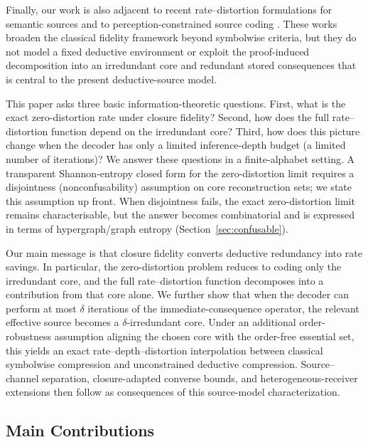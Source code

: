 \documentclass[journal,onecolumn]{IEEEtran}
\numberwithin{equation}{section}
\begin{document}
Finally, our work is also adjacent to recent rate--distortion
formulations for semantic sources and to perception-constrained source
coding
\cite{liu2022indirect,zhao2025semantic,han2025extended,
salehkalaiabar2024rate}. These works broaden the classical fidelity
framework beyond symbolwise criteria, but they do not model a fixed
deductive environment or exploit the proof-induced decomposition into
an irredundant core and redundant stored consequences that is central
to the present deductive-source model.

This paper asks three basic information-theoretic questions. First, what is the exact zero-distortion rate under closure fidelity? Second, how does the full rate--distortion function depend on the irredundant core? Third, how does this picture change when the decoder has only a limited
inference-depth budget (a limited number of iterations)? We answer these questions in a finite-alphabet setting.
A transparent Shannon-entropy closed form for the zero-distortion limit requires a disjointness (nonconfusability) assumption on core reconstruction sets; we state this assumption up front.
When disjointness fails, the exact zero-distortion limit remains characterisable, but the answer becomes combinatorial and is expressed in terms of hypergraph/graph entropy (Section~\ref{sec:confusable}).

Our main message is that closure fidelity converts deductive redundancy into rate savings. In particular, the zero-distortion problem reduces to coding only the irredundant core, and the full rate--distortion function decomposes into a contribution from that core alone. We further show that when the decoder can perform at most \(\delta\)
iterations of the immediate-consequence operator, the relevant effective source becomes a
\(\delta\)-irredundant core. Under an additional order-robustness
assumption aligning the chosen core with the order-free essential
set, this yields an exact rate--depth--distortion interpolation
between classical symbolwise compression and unconstrained
deductive compression. Source--channel separation, closure-adapted converse bounds, and heterogeneous-receiver extensions then follow as consequences of this source-model characterization.

\subsection*{Main Contributions}
\end{document}
